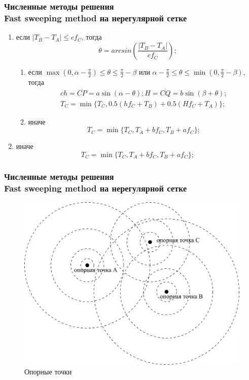 \documentclass[hyperref={unicode=true},professionalfont]{beamer}
\newcommand{\stamp}{
	\begin{frame}[plain,noframenumbering]
		\begin{table}[h!]
			\flushright
			\vspace{5cm}
			\begin{adjustbox}{max width=0.7\textwidth}
				\begin{tabular}{
					|>{\footnotesize}p{0.8cm}|
					>{\footnotesize}p{0.8cm}|
					>{\footnotesize}p{2.2cm}|
					>{\footnotesize}p{1.1cm}|
					>{\footnotesize}p{0.8cm}|
					>{\footnotesize}p{5cm}|
					>{\footnotesize}p{0.1cm}|
					>{\footnotesize}p{0.1cm}|
					>{\footnotesize}p{0.1cm}|
					>{\footnotesize}p{0.8cm}|
					>{\footnotesize}p{1.4cm}|
				}
					\hline
					&&&&& \multicolumn{6}{>{\footnotesize}c|}{\multirow{3}{*}{\Large 0.043.00.00 ПЗ}} \\ \cline{1-5}
					&&&&& \multicolumn{6}{>{\footnotesize}c|}{} \\ \cline{1-5}
					Изм. & Лист & № Документа & Подпись & Дата & \multicolumn{6}{>{\footnotesize}c|}{} \\ \hline
					\multicolumn{2}{|>{\footnotesize}l|}{Разработал}
                    & Апанович Д.В. &  &  &
                                            \multirow{4}{5cm}{\centering
                                            Параллельный алгоритм
                                            численного решения
                                            анизотропного уравнения эйконала} & \multicolumn{3}{>{\footnotesize}l|}{Лит.} & Лист & Листов \\ \cline{1-5}\cline{7-11}
					\multicolumn{2}{|>{\footnotesize}l|}{Проверил}
                    & Казаков А.Л. &  &  &  & У & & & \insertframenumber & \inserttotalframenumber \\ \cline{1-5}\cline{7-11}
					\multicolumn{2}{|>{\footnotesize}l|}{Нормоконтролер}
                    & Казаков А.Л. &  &  &  & \multicolumn{5}{>{\footnotesize}l|}{} \\ \cline{1-5}
					\multicolumn{2}{|>{\footnotesize}l|}{} &  &  &  &  & \multicolumn{5}{>{\footnotesize}l|}{Кафедра АС, гр. ИСТм-16-1} \\ \cline{1-5}
					\multicolumn{2}{|>{\footnotesize}l|}{Утвердил}
                    & Бахвалов С.В. &  &  &  & \multicolumn{5}{>{\footnotesize}l|}{} \\ \hline

				\end{tabular}
			\end{adjustbox}
		\end{table}

	\end{frame}
}
\renewcommand{\stamp}{}
\begin{document}
\begin{frame}
  \frametitle{Численные методы решения \\Fast sweeping method на нерегулярной сетке}

\begin{enumerate}
\item если $|T_B-T_A| \le c f_C$, тогда
  \begin{equation*}
    \theta = arcsin \left(\frac{|T_B-T_A|}{c f_C}\right);
  \end{equation*}
  \begin{enumerate}
  \item если $\max (0,\alpha - \frac{\pi}{2}) \le \theta \le
    \frac{\pi}{2} - \beta$ или $\alpha - \frac{\pi}{2} \le \theta \le
    \min(0, \frac{\pi}{2} - \beta)$, тогда
    \begin{equation*}
      \begin{aligned}{c}
        h = \overline{CP} = a \sin(\alpha - \theta); H =
        \overline{CQ}=
        b \sin (\beta + \theta);\\
        T_C = \min\{T_C,0.5(h f_C + T_B)+0.5(H f_C + T_A)\};
      \end{aligned}
    \end{equation*}
  \item иначе
    \begin{equation*}
      T_C = \min\{T_C,T_A+b f_C, T_B + a f_C\};
    \end{equation*}
  \end{enumerate}
\item иначе
  \begin{equation*}
    T_C = \min\{T_C,T_A+b f_C, T_B + a f_C\};
  \end{equation*}

\end{enumerate}
\end{frame}
\stamp


\begin{frame}
  \frametitle{Численные методы решения \\Fast sweeping method на нерегулярной сетке}
  
\begin{figure}[H]
  \centering
  \includegraphics[width=0.7\linewidth]{refpoints.png}
  \hfil \caption{Опорные точки}
  \label{fig:triangle-front}

\end{figure}

  
\end{frame}
\stamp
\end{document}
